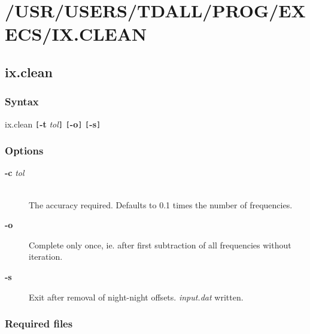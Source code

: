 
\section{/USR/USERS/TDALL/PROG/EXECS/IX.CLEAN}%

\subsection*{ix.clean}%

\subsubsection*{Syntax}%

ix.clean {\tt [}{\bf -t} {\em tol\/}{\tt ]} {\tt [}{\bf -o}{\tt ]} {\tt [}{\bf -s}{\tt ]}

\subsubsection*{Options}%

\begin{description}

\item[{\bf -c} {\em tol\/}]%
%
\hfil\\
The accuracy required. Defaults to 0.1 times the number of frequencies.

\item[{\bf -o}]%
%

Complete only once, ie. after first subtraction of all frequencies without iteration.

\item[{\bf -s}]%
%

Exit after removal of night-night offsets. {\em input.dat\/} written.

\end{description}

\subsubsection*{Required files}%

